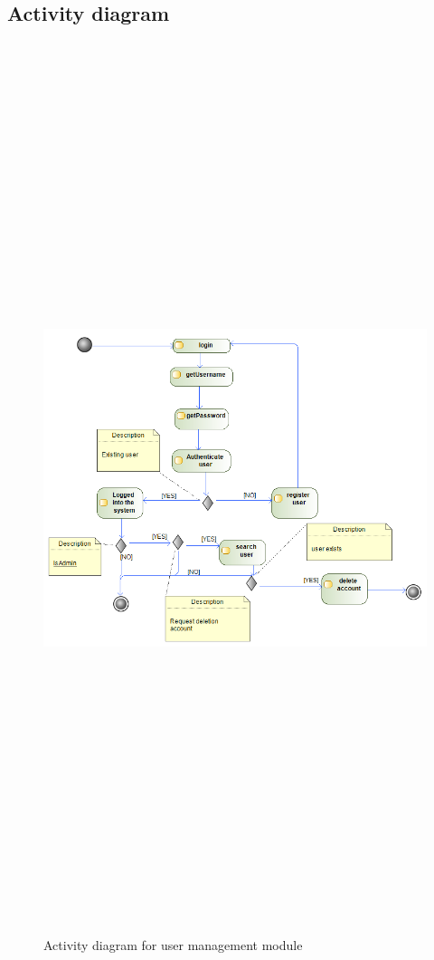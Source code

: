 \subsection{Activity diagram}
\begin{figure}[H]
	\includegraphics[width=12cm,height=26cm,keepaspectratio]{Users/Pictures/user_Activity_diagram.png}
	\caption{Activity diagram for user management module}\label{visina8}
\end{figure}
